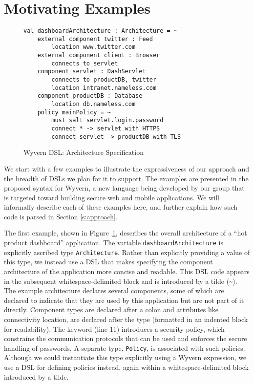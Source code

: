 \section{Motivating Examples}
\label{s:motivation}

\begin{figure}
  \centering
  \begin{lstlisting}
val dashboardArchitecture : Architecture = ~
    external component twitter : Feed
        location www.twitter.com
    external component client : Browser
        connects to servlet
    component servlet : DashServlet
        connects to productDB, twitter
        location intranet.nameless.com
    component productDB : Database
        location db.nameless.com
    policy mainPolicy = ~
        must salt servlet.login.password
        connect * -> servlet with HTTPS
        connect servlet -> productDB with TLS
  \end{lstlisting}
  \caption{Wyvern DSL: Architecture Specification}
  \label{f:dsl-arch}
\end{figure}

We start with a few examples to illustrate the expressiveness of our approach and the breadth of DSLs we plan for it to support.  The examples are presented in the proposed syntax for Wyvern, a new language being developed by our group that is targeted toward building secure web and mobile applications. We will informally describe each of these examples here, and further explain how such code is parsed in Section \ref{s:approach}.

The first example, shown in Figure~\ref{f:dsl-arch}, describes the overall architecture of a ``hot product dashboard'' application.  The variable \lstinline{dashboardArchitecture} is explicitly ascribed type \lstinline{Architecture}. Rather than explicitly providing a value of this type, we instead use a DSL that makes specifying the component architecture of the application more concise and readable. This DSL code appears in the subsequent whitespace-delimited block and is introduced by a tilde (\lstinline{~}). The example architecture declares several components, some of which are declared  to indicate that they are used by this application but are not part of it directly. Component types are declared after a colon and attributes like connectivity location, are declared after the type (formatted in an indented block for readability). 
The  keyword (line 11) introduces a security policy, which constrains the communication protocols that can be used and 
enforces the secure handling of passwords. A separate type, \lstinline{Policy}, is associated with such policies. Although we could instantiate this type explicitly using a Wyvern expression, we use a DSL for defining policies instead, again within a whitespace-delimited block introduced by a tilde.

